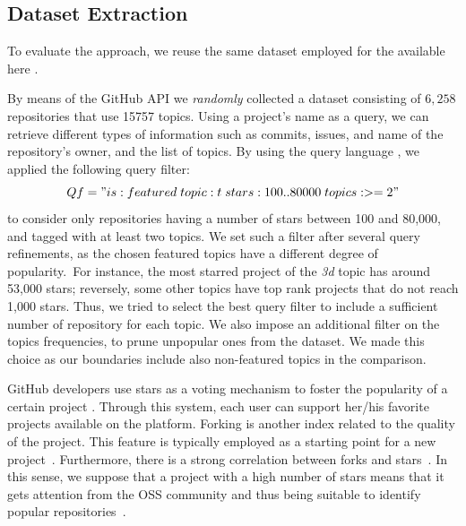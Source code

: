 \subsection{Dataset Extraction} \label{sec:Dataset}



To evaluate the approach, we reuse the same dataset employed for the \MNB available here \cite{MNB_data}.

By means of the GitHub API \cite{githubAPI} we \emph{randomly} collected a dataset consisting of $6,258$ repositories that use 15757 topics.
Using a project's name as a query, we can retrieve different types of information such as commits, issues, and name
of the repository's owner, and the list of topics. By using the \GH query language
\cite{noauthor_understanding_nodate}, we applied the following query filter:
\begin{equation}
\small
Qf = "is:featured \; topic:t \; stars:100..80000 \; topics:>=2"
\end{equation}%
to consider only \GH repositories having a number of stars between 100 and
80,000, and tagged with at least two topics. We set such a filter after several
query refinements, as the chosen featured topics have a different degree of
popularity.~For instance, the most starred project of the \emph{3d} topic has
around 53,000 stars; reversely, some other topics have top rank projects that
do not reach 1,000 stars. Thus, we tried to select the best query filter to
include a sufficient number of repository for each topic.
We also impose an additional filter on the topics frequencies, to prune unpopular ones from the dataset. We made this choice as our boundaries include also non-featured topics in the comparison.



GitHub developers use stars as a voting mechanism to
foster the popularity of a certain project \cite{}. Through this
system, each user can support her/his favorite projects available
on the platform. 
Forking is another index related to the quality of the project. This feature is 
typically employed as a starting point for a new 
project~\cite{Jiang:2017:WDF:3042021.3042043}. Furthermore, there is a strong 
correlation between forks and stars~\cite{7816479}. In this sense, we suppose 
that a project with a high number of stars means that it gets attention from 
the OSS community and thus being suitable to identify popular 
repositories~\cite{borges_popularity_2017, borges_predicting_2016}. 




